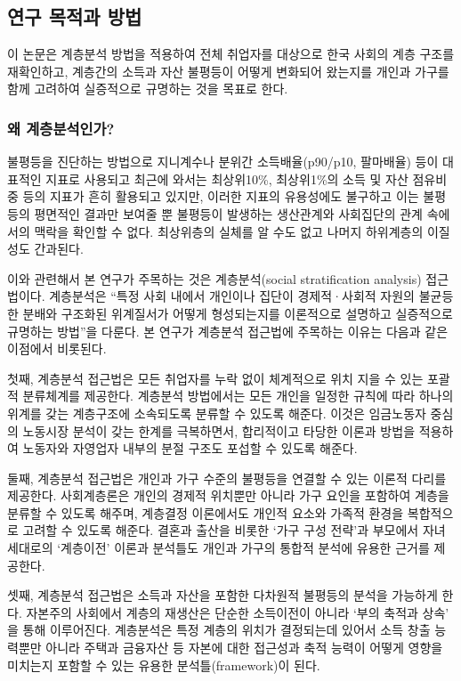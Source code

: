 \documentclass[
  letterpaper,
  DIV=11,
  numbers=noendperiod]{scrartcl}
\begin{document}
\subsection{연구 목적과
방법}\label{uxc5f0uxad6c-uxbaa9uxc801uxacfc-uxbc29uxbc95}

이 논문은 계층분석 방법을 적용하여 전체 취업자를 대상으로 한국 사회의
계층 구조를 재확인하고, 계층간의 소득과 자산 불평등이 어떻게 변화되어
왔는지를 개인과 가구를 함께 고려하여 실증적으로 규명하는 것을 목표로
한다.

\subsubsection{왜
계층분석인가?}\label{uxc65c-uxacc4uxce35uxbd84uxc11duxc778uxac00}

불평등을 진단하는 방법으로 지니계수나 분위간 소득배율(p90/p10, 팔마배율)
등이 대표적인 지표로 사용되고 최근에 와서는 최상위10\%, 최상위1\%의 소득
및 자산 점유비중 등의 지표가 흔히 활용되고 있지만, 이러한 지표의
유용성에도 불구하고 이는 불평등의 평면적인 결과만 보여줄 뿐 불평등이
발생하는 생산관계와 사회집단의 관계 속에서의 맥락을 확인할 수 없다.
최상위층의 실체를 알 수도 없고 나머지 하위계층의 이질성도 간과된다.

이와 관련해서 본 연구가 주목하는 것은 계층분석(social stratification
analysis) 접근법이다. 계층분석은 ``특정 사회 내에서 개인이나 집단이
경제적·사회적 자원의 불균등한 분배와 구조화된 위계질서가 어떻게
형성되는지를 이론적으로 설명하고 실증적으로 규명하는 방법''을 다룬다. 본
연구가 계층분석 접근법에 주목하는 이유는 다음과 같은 이점에서 비롯된다.

첫째, 계층분석 접근법은 모든 취업자를 누락 없이 체계적으로 위치 지을 수
있는 포괄적 분류체계를 제공한다. 계층분석 방법에서는 모든 개인을 일정한
규칙에 따라 하나의 위계를 갖는 계층구조에 소속되도록 분류할 수 있도록
해준다. 이것은 임금노동자 중심의 노동시장 분석이 갖는 한계를 극복하면서,
합리적이고 타당한 이론과 방법을 적용하여 노동자와 자영업자 내부의 분절
구조도 포섭할 수 있도록 해준다.

둘째, 계층분석 접근법은 개인과 가구 수준의 불평등을 연결할 수 있는
이론적 다리를 제공한다. 사회계층론은 개인의 경제적 위치뿐만 아니라 가구
요인을 포함하여 계층을 분류할 수 있도록 해주며, 계층결정 이론에서도
개인적 요소와 가족적 환경을 복합적으로 고려할 수 있도록 해준다. 결혼과
출산을 비롯한 `가구 구성 전략'과 부모에서 자녀 세대로의 `계층이전'
이론과 분석틀도 개인과 가구의 통합적 분석에 유용한 근거를 제공한다.

셋째, 계층분석 접근법은 소득과 자산을 포함한 다차원적 불평등의 분석을
가능하게 한다. 자본주의 사회에서 계층의 재생산은 단순한 소득이전이
아니라 `부의 축적과 상속' 을 통해 이루어진다. 계층분석은 특정 계층의
위치가 결정되는데 있어서 소득 창출 능력뿐만 아니라 주택과 금융자산 등
자본에 대한 접근성과 축적 능력이 어떻게 영향을 미치는지 포함할 수 있는
유용한 분석틀(framework)이 된다.
\end{document}
